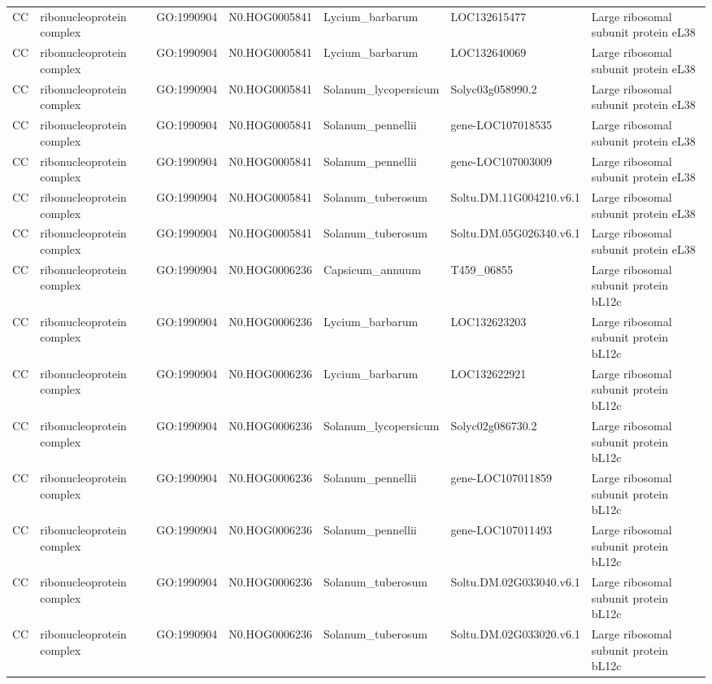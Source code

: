 \begin{table}
\begin{tabular}[t]{lllllll}
CC & ribonucleoprotein complex & GO:1990904 & N0.HOG0005841 & Lycium\_barbarum & LOC132615477 & Large ribosomal subunit protein eL38\\
CC & ribonucleoprotein complex & GO:1990904 & N0.HOG0005841 & Lycium\_barbarum & LOC132640069 & Large ribosomal subunit protein eL38\\
CC & ribonucleoprotein complex & GO:1990904 & N0.HOG0005841 & Solanum\_lycopersicum & Solyc03g058990.2 & Large ribosomal subunit protein eL38\\
CC & ribonucleoprotein complex & GO:1990904 & N0.HOG0005841 & Solanum\_pennellii & gene-LOC107018535 & Large ribosomal subunit protein eL38\\
CC & ribonucleoprotein complex & GO:1990904 & N0.HOG0005841 & Solanum\_pennellii & gene-LOC107003009 & Large ribosomal subunit protein eL38\\
CC & ribonucleoprotein complex & GO:1990904 & N0.HOG0005841 & Solanum\_tuberosum & Soltu.DM.11G004210.v6.1 & Large ribosomal subunit protein eL38\\
CC & ribonucleoprotein complex & GO:1990904 & N0.HOG0005841 & Solanum\_tuberosum & Soltu.DM.05G026340.v6.1 & Large ribosomal subunit protein eL38\\
CC & ribonucleoprotein complex & GO:1990904 & N0.HOG0006236 & Capsicum\_annuum & T459\_06855 & Large ribosomal subunit protein bL12c\\
CC & ribonucleoprotein complex & GO:1990904 & N0.HOG0006236 & Lycium\_barbarum & LOC132623203 & Large ribosomal subunit protein bL12c\\
CC & ribonucleoprotein complex & GO:1990904 & N0.HOG0006236 & Lycium\_barbarum & LOC132622921 & Large ribosomal subunit protein bL12c\\
CC & ribonucleoprotein complex & GO:1990904 & N0.HOG0006236 & Solanum\_lycopersicum & Solyc02g086730.2 & Large ribosomal subunit protein bL12c\\
CC & ribonucleoprotein complex & GO:1990904 & N0.HOG0006236 & Solanum\_pennellii & gene-LOC107011859 & Large ribosomal subunit protein bL12c\\
CC & ribonucleoprotein complex & GO:1990904 & N0.HOG0006236 & Solanum\_pennellii & gene-LOC107011493 & Large ribosomal subunit protein bL12c\\
CC & ribonucleoprotein complex & GO:1990904 & N0.HOG0006236 & Solanum\_tuberosum & Soltu.DM.02G033040.v6.1 & Large ribosomal subunit protein bL12c\\
CC & ribonucleoprotein complex & GO:1990904 & N0.HOG0006236 & Solanum\_tuberosum & Soltu.DM.02G033020.v6.1 & Large ribosomal subunit protein bL12c\\

\end{tabular}
\end{table}
